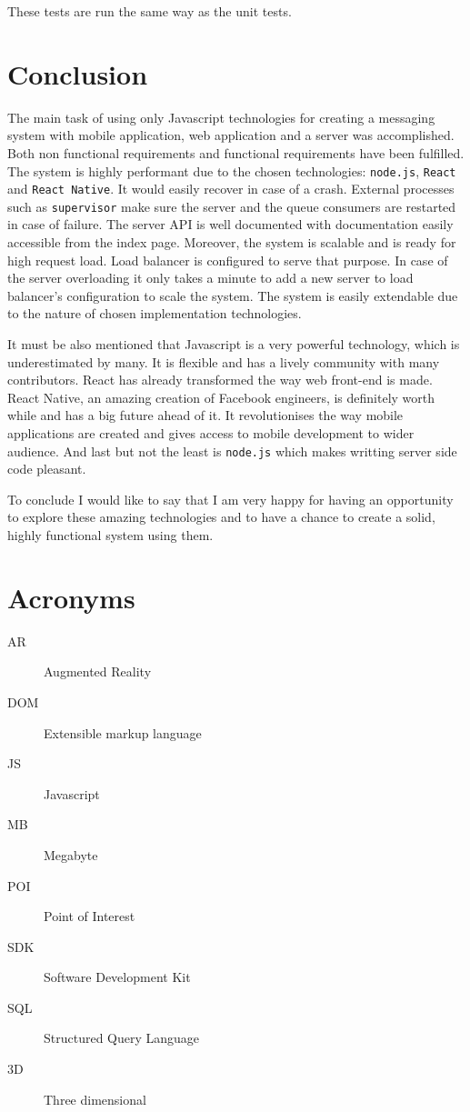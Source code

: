 \documentclass[thesis=M,english]{FITthesis}[2012/10/20]
\begin{document}
These tests are run the same way as the unit tests.

\chapter{Conclusion}

The main task of using only Javascript technologies for creating a messaging system with mobile application, web application and a server was accomplished. Both non functional requirements and functional requirements have been fulfilled. The system is highly performant due to the chosen technologies: \verb|node.js|, \verb|React| and \verb|React Native|. It would easily recover in case of a crash.  External processes such as \verb|supervisor| make sure the server and the queue consumers are restarted in case of failure. The server API is well documented with documentation easily accessible from the index page. Moreover, the system is scalable and is ready for high request load. Load balancer is configured to serve that purpose. In case of the server overloading it only takes a minute to add a new server to load balancer's configuration to scale the system. The system is easily extendable due to the nature of chosen implementation technologies.

It must be also mentioned that Javascript is a very powerful technology, which is underestimated by many. It is flexible and has a lively community with many contributors. React has already transformed the way web front-end is made. React Native, an amazing creation of Facebook engineers, is definitely worth while and has a big future ahead of it. It revolutionises the way mobile applications are created and gives access to mobile development to wider audience. And last but not the least is \verb|node.js| which makes writting server side code pleasant.

To conclude I would like to say that I am very happy for having an opportunity to explore these amazing technologies and to have a chance to create a solid, highly functional system using them.







\appendix

\chapter{Acronyms}
\begin{description}
	\item[AR] Augmented Reality	
	\item[DOM] Extensible markup language	
	\item[JS] Javascript	
	\item[MB] Megabyte	
	\item[POI] Point of Interest
	\item[SDK] Software Development Kit	
	\item[SQL] Structured Query Language				
	\item[3D] Three dimensional		
	
\end{description}
\end{document}
